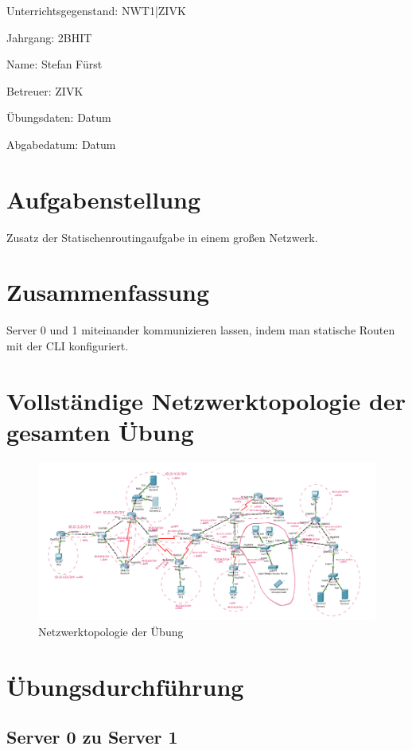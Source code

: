 \documentclass[a4paper]{article}
\begin{document}
\vspace*{\fill}
Unterrichtsgegenstand:	NWT1|ZIVK

Jahrgang:	2BHIT

Name:	Stefan Fürst

Betreuer: 	ZIVK

Übungsdaten:	Datum

Abgabedatum:	Datum


\newpage
\tableofcontents

\newpage

\section{Aufgabenstellung}
Zusatz der Statischenroutingaufgabe in einem großen Netzwerk.
\section{Zusammenfassung}
Server 0 und 1 miteinander kommunizieren lassen, indem man statische Routen mit der CLI konfiguriert.


\newpage

\section{Vollständige Netzwerktopologie der gesamten Übung}

\begin{figure}[h]
	\includegraphics[scale=0.5]{topologie.png}
	\caption{Netzwerktopologie der Übung}
\end{figure}

\newpage

\section{Übungsdurchführung}
\subsection{Server 0 zu Server 1}
\end{document}
